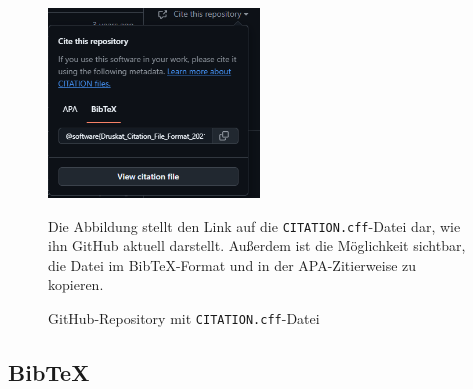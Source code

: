 \begin{figure}
    \centering
    \includegraphics[width=0.5\textwidth]{bilder/GH_CFF_link.png}
    \caption{GitHub-Repository mit \texttt{CITATION.cff}-Datei}
    \label{fig:gh_cff_link}
    \small
    Die Abbildung stellt den Link auf die \texttt{CITATION.cff}-Datei dar, wie ihn GitHub aktuell darstellt.
    Außerdem ist die Möglichkeit sichtbar, die Datei im Bib\TeX{}-Format und in der APA-Zitierweise zu kopieren.
\end{figure}

\subsection{Bib\TeX{}}
\label{subsec:bibtex_format}
